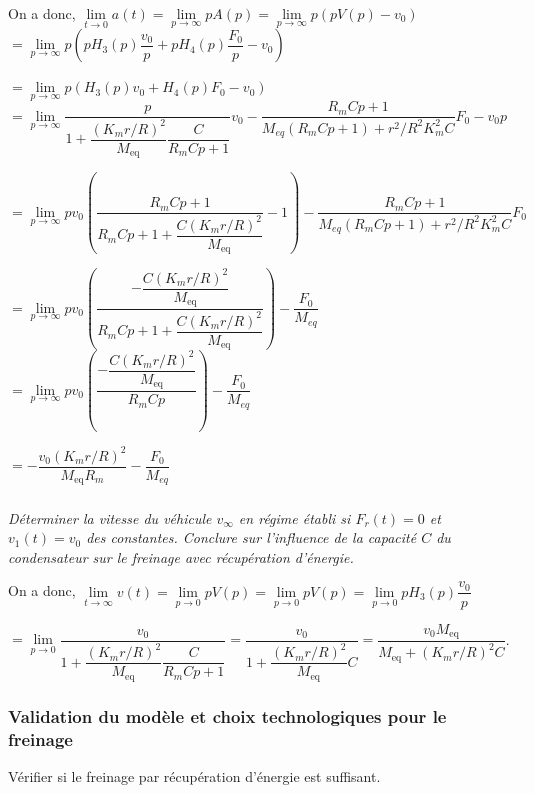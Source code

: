 \documentclass[10pt,fleqn]{article} %
\begin{document}
\begin{multicols}{2}
\begin{corrige}
On a donc, 
$\lim\limits_{t\to 0} a(t)=\lim\limits_{p\to \infty} pA(p)=\lim\limits_{p\to \infty} p\left(pV(p)-v_0\right)$
$=\lim\limits_{p\to \infty} p \left( pH_3(p) \dfrac{v_0}{p} + pH_4(p) \dfrac{F_0}{p}-v_0\right)$

$=\lim\limits_{p\to \infty} p \left( H_3(p) {v_0} + H_4(p) F_0-v_0\right)$
$=\lim\limits_{p\to \infty}   \dfrac{p}{1+\dfrac{\left(K_m r/R\right)^2}{M_{\text{eq}}}\dfrac{C}{R_m Cp+1}}  {v_0} -\dfrac{R_mCp+1 }{M_{eq}  \left(R_m  Cp+1\right) +r^2/R^2 K_m^2C} F_0 -v_0p$

$=\lim\limits_{p\to \infty}   pv_0 \left( \dfrac{R_mCp+1}{R_mCp+1+\dfrac{C\left(K_m r/R\right)^2}{M_{\text{eq}}}} -1  \right) -\dfrac{R_mCp+1 }{M_{eq}  \left(R_m  Cp+1\right) +r^2/R^2 K_m^2C} F_0$

$=\lim\limits_{p\to \infty}  pv_0 \left( \dfrac{-\dfrac{C\left(K_m r/R\right)^2}{M_{\text{eq}}}}{R_mCp+1+\dfrac{C\left(K_m r/R\right)^2}{M_{\text{eq}}}} \right)-\dfrac{ F_0}{M_{eq}} $
$=\lim\limits_{p\to \infty}  pv_0 \left( \dfrac{-\dfrac{C\left(K_m r/R\right)^2}{M_{\text{eq}}}}{R_mCp} \right)-\dfrac{ F_0}{M_{eq}} $


$=   -\dfrac{v_0\left(K_m r/R\right)^2}{M_{\text{eq}}R_m} -\dfrac{ F_0}{M_{eq}} $

\end{corrige}
\else
\fi



\subparagraph{}
\textit{Déterminer la vitesse du véhicule $v_{\infty}$ en régime établi si $F_r (t) = 0$ et $v_1(t) = v_0$ des constantes. Conclure sur l’influence de la capacité $C$ du condensateur sur le freinage avec récupération d’énergie.}
\ifprof
\begin{corrige}

On a donc, 
$\lim\limits_{t\to \infty} v(t)=\lim\limits_{p\to 0} pV(p)=\lim\limits_{p\to 0} pV(p)=\lim\limits_{p\to 0} p H_3(p) \dfrac{v_0}{p}$

$=\lim\limits_{p\to 0}   \dfrac{v_0}{1+\dfrac{\left(K_m r/R\right)^2}{M_{\text{eq}}}\dfrac{C}{R_m Cp+1}} =\dfrac{v_0}{1+\dfrac{\left(K_m r/R\right)^2}{M_{\text{eq}}}C}=\dfrac{v_0M_{\text{eq}}}{M_{\text{eq}}+\left(K_m r/R\right)^2C} $.
\end{corrige}
\else
\fi

\subsubsection*{Validation du modèle et choix technologiques pour le freinage}
\begin{obj}
Vérifier si le freinage par récupération d’énergie est suffisant.
\end{obj}


\end{multicols}
\end{document}
